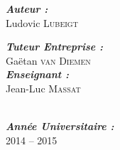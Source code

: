 \documentclass[a4paper,10pt]{report}
\begin{document}
\begin{titlepage}
\begin{center}
    \begin{minipage}{0.4\textwidth}
      \begin{flushleft} \large
        \emph{\bfseries Auteur :}\\
        Ludovic \textsc{Lubeigt}
      \end{flushleft}
    \end{minipage}
    \begin{minipage}{0.4\textwidth}
      \begin{flushright}
        \large \emph{\bfseries Tuteur Entreprise :}\\
        Ga\"etan \textsc{van Diemen}\\[0.2cm]
        \emph{\bfseries Enseignant :}\\
        Jean-Luc \textsc{Massat}
      \end{flushright}
    \end{minipage}\\[1.5cm]
      
    \large\emph{\bfseries Ann\'ee Universitaire :}\\
    2014 -- 2015

  \end{center}
\end{titlepage}

\begin{abstract}
\end{abstract}
\end{document}
